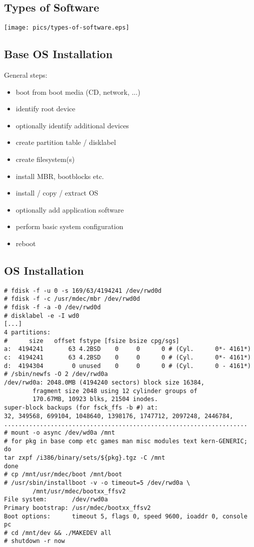 \documentclass[xga]{xdvislides}
\begin{document}
\subsection{Types of Software}
\vfill
\begin{center}
	\texttt{[image: pics/types-of-software.eps]}
\end{center}
\vfill

\subsection{Base OS Installation}
General steps:
\begin{itemize}
	\item boot from boot media (CD, network, ...)
	\item identify root device
	\item optionally identify additional devices
	\item create partition table / disklabel
	\item create filesystem(s)
	\item install MBR, bootblocks etc.
	\item install / copy / extract OS
	\item optionally add application software
	\item perform basic system configuration
	\item reboot
\end{itemize}

\subsection{OS Installation}
\small
\begin{verbatim}
# fdisk -f -u 0 -s 169/63/4194241 /dev/rwd0d
# fdisk -f -c /usr/mdec/mbr /dev/rwd0d
# fdisk -f -a -0 /dev/rwd0d
# disklabel -e -I wd0
[...]
4 partitions:
#      size   offset fstype [fsize bsize cpg/sgs]
a:  4194241       63 4.2BSD    0     0      0 # (Cyl.      0*- 4161*)
c:  4194241       63 4.2BSD    0     0      0 # (Cyl.      0*- 4161*)
d:  4194304        0 unused    0     0      0 # (Cyl.      0 - 4161*)
# /sbin/newfs -O 2 /dev/rwd0a
/dev/rwd0a: 2048.0MB (4194240 sectors) block size 16384,
        fragment size 2048 using 12 cylinder groups of
        170.67MB, 10923 blks, 21504 inodes.
super-block backups (for fsck_ffs -b #) at:
32, 349568, 699104, 1048640, 1398176, 1747712, 2097248, 2446784,
....................................................................
# mount -o async /dev/wd0a /mnt
# for pkg in base comp etc games man misc modules text kern-GENERIC; do
tar zxpf /i386/binary/sets/${pkg}.tgz -C /mnt
done
# cp /mnt/usr/mdec/boot /mnt/boot
# /usr/sbin/installboot -v -o timeout=5 /dev/rwd0a \
        /mnt/usr/mdec/bootxx_ffsv2
File system:       /dev/rwd0a
Primary bootstrap: /usr/mdec/bootxx_ffsv2
Boot options:      timeout 5, flags 0, speed 9600, ioaddr 0, console pc
# cd /mnt/dev && ./MAKEDEV all
# shutdown -r now
\end{verbatim}
\Normalsize
\end{document}

